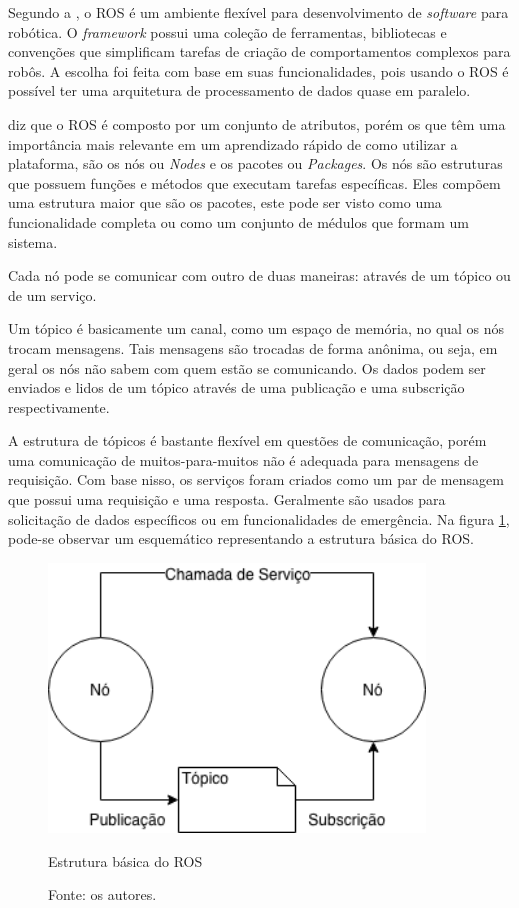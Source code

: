 Segundo a , o ROS é um ambiente flexível para desenvolvimento de \textit{software} para robótica. O \textit{framework} possui uma coleção de ferramentas, bibliotecas e convenções que simplificam tarefas de criação de comportamentos complexos para robôs. A escolha foi feita com base em suas funcionalidades, pois usando o ROS é possível ter uma arquitetura de processamento de dados quase em paralelo.

 diz que o ROS é composto por um conjunto de atributos, porém os que têm uma importância mais relevante em um aprendizado rápido de como utilizar a plataforma, são os nós ou \textit{Nodes} e os pacotes ou \textit{Packages}. Os nós são estruturas que possuem funções e métodos que executam tarefas específicas. Eles compõem uma estrutura maior que são os pacotes, este pode ser visto como uma funcionalidade completa ou como um conjunto de médulos que formam um sistema.

Cada nó pode se comunicar com outro de duas maneiras: através de um tópico ou de um serviço.

 Um tópico é basicamente um canal, como um espaço de memória, no qual os nós trocam mensagens. Tais mensagens são trocadas de forma anônima, ou seja, em geral os nós não sabem com quem estão se comunicando. Os dados podem ser enviados e lidos de um tópico através de uma publicação e uma subscrição respectivamente.

A estrutura de tópicos é bastante flexível em questões de comunicação, porém uma comunicação de muitos-para-muitos não é adequada para mensagens de requisição. Com base nisso, os serviços foram criados como um par de mensagem que possui uma requisição e uma resposta. Geralmente são usados para solicitação de dados específicos ou em funcionalidades de emergência. Na figura \ref{Fig:ros}, pode-se observar um esquemático representando a estrutura básica do ROS.



\begin{figure}[!ht]
\centering
\includegraphics[width=10cm]{Figures/ros.png}
\caption{Estrutura básica do ROS}\label{Fig:ros}
\caption*{Fonte: os autores.}
\end{figure}

